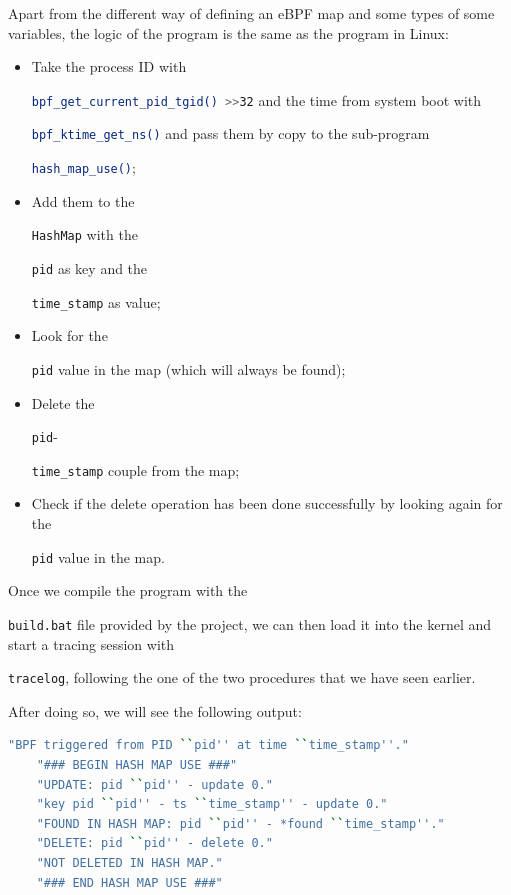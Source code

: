 Apart from the different way of defining an eBPF map and some types of some variables, the logic of the program is the same as the program in Linux: 

\begin{itemize}
	\item 
		Take the process ID with \raggedright\colorbox{backcolour}{\lstinline[style=commandline, language=bash]|bpf_get_current_pid_tgid() >>32|} and the time from system boot with \raggedright\colorbox{backcolour}{\lstinline[style=commandline, language=bash]|bpf_ktime_get_ns()|} and pass them by copy to the sub-program \raggedright\colorbox{backcolour}{\lstinline[style=commandline, language=bash]|hash_map_use()|};
	\item 
		Add them to the \raggedright\colorbox{backcolour}{\lstinline[style=commandline, language=bash]|HashMap|} with the \raggedright\colorbox{backcolour}{\lstinline[style=commandline, language=bash]|pid|} as key and the \raggedright\colorbox{backcolour}{\lstinline[style=commandline, language=bash]|time_stamp|} as value;
	\item 
		Look for the \raggedright\colorbox{backcolour}{\lstinline[style=commandline, language=bash]|pid|} value in the map (which will always be found);
	\item 
		Delete the \raggedright\colorbox{backcolour}{\lstinline[style=commandline, language=bash]|pid|}-\raggedright\colorbox{backcolour}{\lstinline[style=commandline, language=bash]|time_stamp|} couple from the map;
	\item 
		Check if the delete operation has been done successfully by looking again for the \raggedright\colorbox{backcolour}{\lstinline[style=commandline, language=bash]|pid|} value in the map.
\end{itemize}

Once we compile the program with the \raggedright\colorbox{backcolour}{\lstinline[style=commandline, language=bash]|build.bat|} file provided by the project, we can then load it into the kernel and start a tracing session with \raggedright\colorbox{backcolour}{\lstinline[style=commandline, language=bash]|tracelog|}, following the one of the two procedures that we have seen earlier.

After doing so, we will see the following output:

\begin{lstlisting}[style=commandline, language=bash, caption={Debug messages of the program that uses a map in windows-ebpf-starter.}]
	"BPF triggered from PID ``pid'' at time ``time_stamp''."
	"### BEGIN HASH MAP USE ###"
	"UPDATE: pid ``pid'' - update 0."
	"key pid ``pid'' - ts ``time_stamp'' - update 0."
	"FOUND IN HASH MAP: pid ``pid'' - *found ``time_stamp''."
	"DELETE: pid ``pid'' - delete 0."
	"NOT DELETED IN HASH MAP."
	"### END HASH MAP USE ###"
\end{lstlisting}

